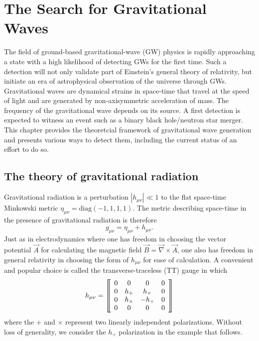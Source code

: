 \chapter{The Search for Gravitational Waves}

The field of ground-based gravitational-wave (GW) physics is rapidly
approaching a state with a high likelihood of detecting GWs for the
first time. Such a detection will not only validate part of Einstein's
general theory of relativity, but initiate an era of astrophysical
observation of the universe through GWs. Gravitational waves are
dynamical strains in space-time that travel at the speed of light and
are generated by non-axisymmetric acceleration of mass. The frequency
of the gravitational wave depends on its source. A first detection is
expected to witness an event such as a binary black
hole/neutron star merger. This chapter provides the theoretcial
framework of gravitational wave generation and presents various ways
to detect them, including the current status of an effort to do so.

\section{The theory of gravitational radiation}
Gravitational radiation is a perturbation $|h_{\mu \nu}|
\ll 1$ to the flat space-time Minkowski metric $\eta_{\mu \nu} =
\mbox{diag}(-1, 1, 1, 1)$. The metric describing space-time in the
presence of gravitational radiation is therefore
\begin{equation}
g_{\mu\nu} = \eta_{\mu\nu} + h_{\mu\nu}.
\end{equation}
Just as in electrodynamics where one has freedom in choosing the
vector potential $\vec{A}$ for calculating the magnetic field $\vec{B}
= \vec{\nabla} \times \vec{A}$, one also has freedom in general
relativity in choosing the form of $h_{\mu \nu}$ for ease of calculation. A
convenient and popular choice is called the transverse-traceless (TT)
gauge in which
\begin{equation}
h_{\mu \nu} = 
\left\llbracket \begin{array}{c c c c} 
0 & 0 & 0 & 0\\ 
0 & h_+ & h_\times & 0 \\
0 & h_\times & -h_+ & 0 \\
0 & 0 & 0 & 0
\end{array} \right\rrbracket
\end{equation}
where the $+$ and $\times$ represent two linearly independent
polarizations. Without loss of generality, we consider the $h_+$
polarization in the example that follows.

